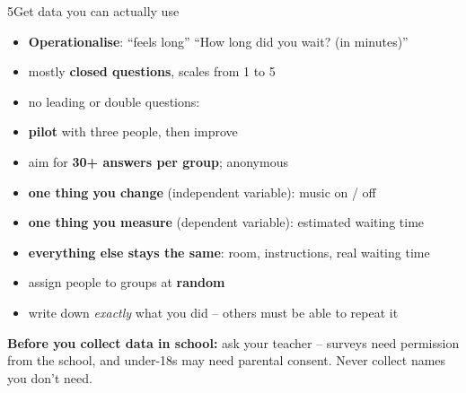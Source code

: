 \newpage
\begin{wsbox}{5}{Get data you can actually use}
\begin{minipage}[t]{0.485\linewidth}\vspace{0pt}
\begin{itemize}[itemsep=0.3mm]
\item \textbf{Operationalise}: “feels long” \pfeil “How long did you wait? (in minutes)”
\item mostly \textbf{closed questions}, scales from 1 to 5
\item no leading or double questions:\newline
{}
\item \textbf{pilot} with three people, then improve
\item aim for \textbf{30+ answers per group}; anonymous
\end{itemize}
\end{minipage}\hfill
\begin{minipage}[t]{0.485\linewidth}\vspace{0pt}
\begin{itemize}[itemsep=0.3mm]
\item \textbf{one thing you change} (independent variable): music on / off
\item \textbf{one thing you measure} (dependent variable): estimated waiting time
\item \textbf{everything else stays the same}: room, instructions, real waiting time
\item assign people to groups at \textbf{random}
\item write down \emph{exactly} what you did – others must be able to repeat it
\end{itemize}
\end{minipage}
\par\vspace{1mm}
\begin{warnbox}\small\textbf{Before you collect data in school:} ask your teacher – surveys need permission from the school, and under-18s may need parental consent. Never collect names you don't need.\end{warnbox}
\par\vspace{1mm}
\begin{minipage}[t]{0.42\linewidth}\vspace{0pt}

\end{minipage}
\end{wsbox}

